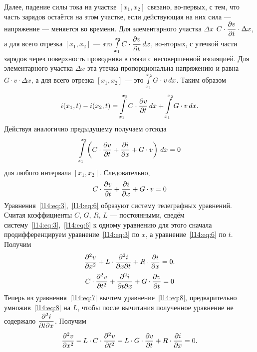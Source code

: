 Далее, падение силы тока на участке $[x_1,x_2]$ связано, во-первых, с тем, что часть зарядов остаётся на этом участке, если действующая на них сила --- напряжение --- меняется во времени. Для элементарного участка $\Delta x$ $\displaystyle C\cdot\frac{\partial v}{\partial t}\cdot\Delta x$, а для всего отрезка $[x_1,x_2]$ --- это $\displaystyle\smallint\limits_{x_1}^{x_2}C\cdot\frac{\partial v}{\partial t}\,dx$,	во-вторых, с утечкой части зарядов через поверхность проводника в связи с несовершенной изоляцией. Для элементарного участка $\Delta x$ эта утечка пропорциональна напряжению и равна $G\cdot v\cdot\Delta x$, а для всего отрезка $[x_1,x_2]$ --- это $\displaystyle\smallint\limits_{x_1}^{x_2}G\cdot v\,dx$.
Таким образом 
\begin{equation}\label{l14:eq:4}
	\hfill i(x_1,t)-i(x_2,t)=\int\limits_{x_1}^{x_2}C\cdot\pder{v}{t}\,dx+\int\limits_{x_1}^{x_2}G\cdot v\,dx.\hfill
\end{equation} 
Действуя аналогично предыдущему получаем отсюда
\begin{equation}\label{l14:eq:5}
	\hfill \int\limits_{x_1}^{x_2}\left(C\cdot\pder{v}{t}+\pder{i}{x}+G\cdot v\right)\,dx=0\hfill
\end{equation} 
для любого интервала $[x_1,x_2]$. Следовательно,
\begin{equation}\label{l14:eq:6}
	\hfill C\cdot\pder{v}{t}+\pder{i}{x}+G\cdot v=0\hfill
\end{equation}  
Уравнения~\eqref{l14:eq:3},~\eqref{l14:eq:6} образуют систему телеграфных уравнений. Считая коэффициенты $C$, $G$, $R$, $L$ --- постоянными, сведём систему~\eqref{l14:eq:3},~\eqref{l14:eq:6} к одному уравнению для этого сначала продифференцируем уравнение~\eqref{l14:eq:3} по $x$, а уравнение~\eqref{l14:eq:6} по $t$. Получим 
\begin{equation}\label{l14:eq:7}
	\hfill \pdder{v}{x}+L\cdot\pder{^2i}{x\partial t}+R\cdot \pder{i}{x}=0.\hfill
\end{equation}
\begin{equation}\label{l14:eq:8}
	\hfill C\cdot\pdder{v}{t}+\pder{^2i}{t\partial x}+G\cdot \pder{v}{t}=0\hfill
\end{equation} 
Теперь из уравнения~\eqref{l14:eq:7} вычтем уравнение~\eqref{l14:eq:8}, предварительно умножив~\eqref{l14:eq:8} на $L$, чтобы после вычитания полученное уравнение не содержало $\displaystyle\frac{\partial^2i}{\partial t\partial x}$. Получим
\begin{equation}\label{l14:eq:9}
	\hfill \pdder{v}{x}-L\cdot C\cdot\pdder{v}{t}-L\cdot G\cdot \pder{v}{t}+R\cdot \pder{i}{x}=0.\hfill
\end{equation} 
